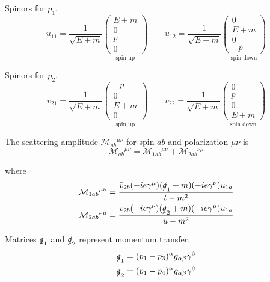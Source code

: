 Spinors for $p_1$.
\begin{equation*}
u_{11}=\frac{1}{\sqrt{E+m}}
\underset{\text{spin up}}
{\begin{pmatrix}E+m\\0\\p\\0\end{pmatrix}}
\qquad
u_{12}=\frac{1}{\sqrt{E+m}}
\underset{\text{spin down}}
{\begin{pmatrix}0\\E+m\\0\\-p\end{pmatrix}}
\end{equation*}

Spinors for $p_2$.
\begin{equation*}
v_{21}=\frac{1}{\sqrt{E+m}}
\underset{\text{spin up}}
{\begin{pmatrix}-p\\0\\E+m\\0\end{pmatrix}}
\qquad
v_{22}=\frac{1}{\sqrt{E+m}}
\underset{\text{spin down}}
{\begin{pmatrix}0\\p\\0\\E+m\end{pmatrix}}
\end{equation*}

The scattering amplitude $\mathcal M_{ab}{}^{\mu\nu}$
for spin $ab$ and polarization $\mu\nu$ is
\begin{equation*}
\mathcal M_{ab}{}^{\mu\nu}=\mathcal M_{1ab}{}^{\mu\nu}+\mathcal M_{2ab}{}^{\nu\mu}
\end{equation*}

where
\begin{align*}
\mathcal M_{1ab}{}^{\mu\nu}
&=\frac{\bar v_{2b}(-ie\gamma^\mu)(\slashed q_1+m)(-ie\gamma^\nu)u_{1a}}{t-m^2}
\\
\mathcal M_{2ab}{}^{\nu\mu}
&=\frac{\bar v_{2b}(-ie\gamma^\nu)(\slashed q_2+m)(-ie\gamma^\mu)u_{1a}}{u-m^2}
\end{align*}

Matrices $\slashed q_1$ and $\slashed q_2$ represent momentum transfer.
\begin{align*}
\slashed q_1&=(p_1-p_3)^\alpha g_{\alpha\beta}\gamma^\beta
\\
\slashed q_2&=(p_1-p_4)^\alpha g_{\alpha\beta}\gamma^\beta
\end{align*}

